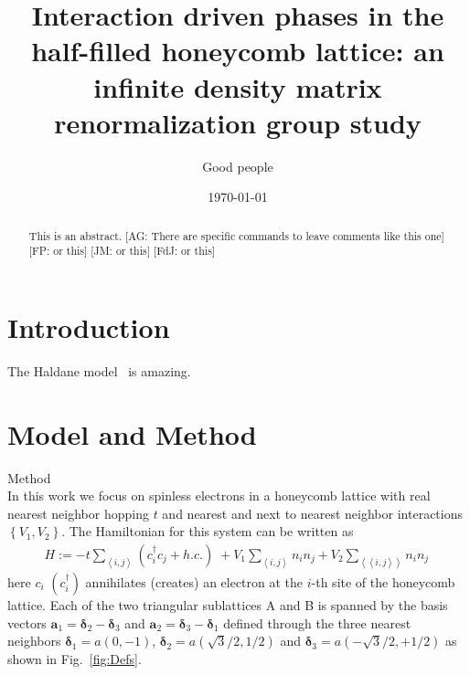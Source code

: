 \documentclass[aps,prx,10pt,twocolumn,floatfix,superscriptaddress,showpacs,numerical,footinbib]{revtex4-1}
\newcommand{\noteAG}[1]{{\color{blue} [AG: #1]}}
\newcommand{\noteFP}[1]{{\color{magenta} [FP: #1]}}
\newcommand{\noteJM}[1]{{\color{red} [JM: #1]}}
\newcommand{\noteFdJ}[1]{{\color{cyan} [FdJ: #1]}}
\newcommand{\bs}[1]{{\boldsymbol{#1}}}
\begin{document}
%
\title{Interaction driven phases in the half-filled honeycomb lattice: an infinite density matrix renormalization group study}
%
\author{Good people}
%
\date{\today}
%
\begin{abstract}
%
This is an abstract. \noteAG{There are specific commands to leave comments like this one}\noteFP{or this}\noteJM{or this}\noteFdJ{or this}
%
\end{abstract}
%
\maketitle
%

\section{Introduction}
%
The Haldane model~\cite{H88} is amazing.
%
\section{Model and Method}
%
Method\\
%
In this work we focus on spinless electrons in a honeycomb lattice with real  nearest neighbor hopping $t$ and nearest and next to nearest neighbor interactions 
$\left\lbrace V_{1},V_{2}\right\rbrace$. 
%
The Hamiltonian for this system can be written as
\begin{eqnarray}
%
H:=-t\sum_{\left\langle i,j\right\rangle }(c^{\dagger}_{i}c_{j}+h.c.)
%
\;+
V_{1}\sum_{\left\langle i,j\right\rangle }n_{i}n_{j}+
%
V_{2}\sum_{\left\langle \left\langle i,j\right\rangle \right\rangle }n_{i}n_{j}\,
%
\label{eq:H}
%
\end{eqnarray}
%
here $c_{i}$ $(c^{\dagger}_{i})$  annihilates (creates) an electron at the $i$-th site of the honeycomb lattice. 
%
Each of the two triangular sublattices A and B is spanned by the basis vectors
$\bs{a}_{1}=\bs{\delta}_{2}-\bs{\delta}_{3}$ and 
$\bs{a}_{2}=\bs{\delta}_{3}-\bs{\delta}_{1}$ defined through the three nearest neighbors $\bs{\delta}_{1}=a(0,-1)$,  
$\bs{\delta}_{2}=a(\sqrt{3}/2,1/2)$ and $\bs{\delta}_{3}=a(-\sqrt{3}/2,+1/2)$ as shown in Fig.~\ref{fig:Defs}.
\end{document}
